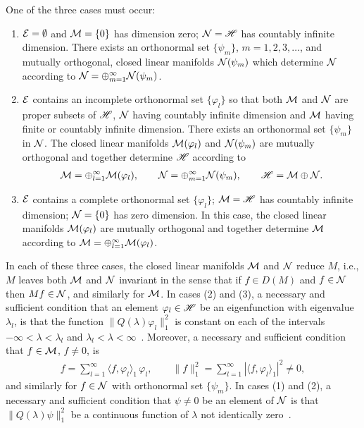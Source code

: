 \documentclass[amsa]{ipart}
\begin{document}
\begin{theorem}
\label{thm:Hilbert_Eig_Decomp}  
One of the three cases must occur:
%
\begin{enumerate}
\item $\mathcal{E}=\emptyset$ and $\mathcal{M}=\{0\}$ has dimension zero; $\mathcal{N}=\mathscr{H}$
has countably infinite dimension. There exists an
orthonormal set $\{\psi_m\}$, $m=1,2,3,\ldots$, and mutually orthogonal, closed
linear manifolds $\mathcal{N}(\psi_m)$ which determine $\mathcal{N}$ according to
$\mathcal{N}=\oplus_{m=1}^\infty\mathcal{N}(\psi_m)$.    
\item $\mathcal{E}$ contains an incomplete orthonormal set $\{\varphi_l\}$ so that
both $\mathcal{M}$ and $\mathcal{N}$ are proper subsets of $\mathscr{H}$, $\mathcal{N}$ having
countably infinite dimension and $\mathcal{M}$ having finite or countably
infinite dimension. There exists an orthonormal set
$\{\psi_m\}$ in $\mathcal{N}$. The closed linear manifolds $\mathcal{M}(\varphi_l)$ and
$\mathcal{N}(\psi_m)$ are mutually orthogonal and together determine $\mathscr{H}$
according to   
%
\begin{align*}
  \Mc=\oplus_{l=1}^\infty\Mc(\varphi_l), \qquad
  \Nc=\oplus_{m=1}^\infty\Nc(\psi_m), \qquad
  \Hs=\Mc\oplus\Nc.
\end{align*}
%
\item $\mathcal{E}$ contains a complete orthonormal set $\{\varphi_l\}$; $\mathcal{M}=\mathscr{H}$
has countably infinite dimension; $\mathcal{N}=\{0\}$ has zero dimension. In
this case, the closed linear manifolds $\mathcal{M}(\varphi_l)$ are mutually
orthogonal and together determine $\mathcal{M}$ according 
to $\mathcal{M}=\oplus_{l=1}^\infty\mathcal{M}(\varphi_l)$.     
\end{enumerate}
%

In each of these three cases, the closed linear manifolds $\mathcal{M}$ and
$\mathcal{N}$ reduce $M$, i.e., $M$ leaves both $\mathcal{M}$ and $\mathcal{N}$ invariant in
the sense that if $f\in D(M)$ and $f\in\mathcal{N}$ then $M f\in\mathcal{N}$, and similarly
for $\mathcal{M}$. In cases (2) and (3), a necessary and sufficient condition
that an 
element $\varphi_l\in\mathscr{H}$ be an eigenfunction with eigenvalue $\lambda_l$, is that
the function $\|Q(\lambda)\varphi_l\|_1^2$ is constant on each of the intervals
$-\infty<\lambda<\lambda_l$ and $\lambda_l<\lambda<\infty$~\cite{Stone:64}. Moreover, a necessary and
sufficient condition that $f\in\mathcal{M}$, $f\neq0$, is 
%
\begin{align}\label{eq:Eig_Fun_Exp_f}
  f=\sum_{l=1}^\infty\langle f,\varphi_l\rangle_1\,\varphi_l,
  \qquad
  \|f\|_1^2=\sum_{l=1}^\infty|\langle f,\varphi_l\rangle_1|^2\neq0,
\end{align}
%
and similarly for $f\in\mathcal{N}$ with orthonormal set $\{\psi_m\}$.
In cases (1) and (2), a necessary and sufficient condition that $\psi\neq0$
be an element of $\mathcal{N}$ is that $\|Q(\lambda)\psi\|_1^2$ be a continuous function
of $\lambda$ not identically zero~\cite{Stone:64}. 



\end{theorem}
\end{document}
